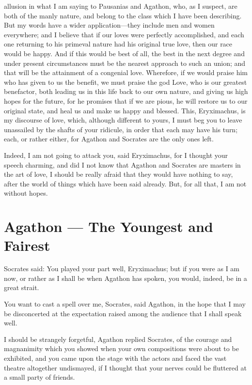 allusion in what I am saying to Pausanias and Agathon, who, as I suspect, are both of the manly nature, and belong to the class which I have been describing. But my words have a wider application---they include men and women everywhere; and I believe that if our loves were perfectly accomplished, and each one returning to his primeval nature had his original true love, then our race would be happy. And if this would be best of all, the best in the next degree and under present circumstances must be the nearest approach to such an union; and that will be the attainment of a congenial love. Wherefore, if we would praise him who has given to us the benefit, we must praise the god Love, who is our greatest benefactor, both leading us in this life back to our own nature, and giving us high hopes for the future, for he promises that if we are pious, he will restore us to our original state, and heal us and make us happy and blessed. This, Eryximachus, is my discourse of love, which, although different to yours, I must beg you to leave unassailed by the shafts of your ridicule, in order that each may have his turn; each, or rather either, for Agathon and Socrates are the only ones left.

\para[65] Indeed, I am not going to attack you, said Eryximachus, for I thought your speech charming, and did I not know that Agathon and Socrates are masters in the art of love, I should be really afraid that they would have nothing to say, after the world of things which have been said already. But, for all that, I am not without hopes.

\section*{Agathon — The Youngest and Fairest}

\para[66] Socrates said: You played your part well, Eryximachus; but if you were as I am now, or rather as I shall be when Agathon has spoken, you would, indeed, be in a great strait.

\para[67] You want to cast a spell over me, Socrates, said Agathon, in the hope that I may be disconcerted at the expectation raised among the audience that I shall speak well.

\para[68] I should be strangely forgetful, Agathon replied Socrates, of the courage and magnanimity which you showed when your own compositions were about to be exhibited, and you came upon the stage with the actors and faced the vast theatre altogether undismayed, if I thought that your nerves could be fluttered at a small party of friends.

